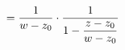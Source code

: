 \documentclass[preview]{standalone}
\begin{document}
\begin{align*}
\special{dvisvgm:raw <g id='unique000'>}= \frac{1}{w-z_0} \cdot \frac{1}{1 - \dfrac{z-z_0}{w-z_0}}\special{dvisvgm:raw </g>}
\end{align*}
\end{document}
